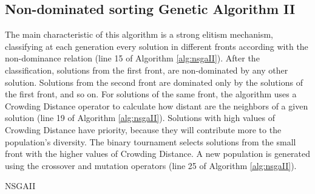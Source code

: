\subsection{Non-dominated sorting Genetic Algorithm II}


The main characteristic of this algorithm is a strong elitism mechanism, classifying at each generation every solution in different fronts according with the non-dominance relation (line 15 of Algorithm \ref{alg:nsgaII}). After the classification, solutions from the first front, are non-dominated by any other solution. Solutions from the second front are dominated only by the solutions of the first front, and so on. For solutions of the same front, the algorithm uses a Crowding Distance operator to calculate how distant are the neighbors of a given solution (line 19 of Algorithm \ref{alg:nsgaII}). Solutions with high values of Crowding Distance have priority, because they will contribute more to the population's diversity. The binary tournament selects solutions from the small front with the higher values of Crowding Distance. A new population is generated using the crossover and mutation operators (line 25 of Algorithm \ref{alg:nsgaII}).


\begin{algorithm}[htb]
	\begin{algorithmic}[1]
		\EndWhile
			\EndWhile
			
		\EndWhile
	\end{algorithmic}
	\caption{NSGAII}
	\label{alg:nsgaII}
\end{algorithm}


